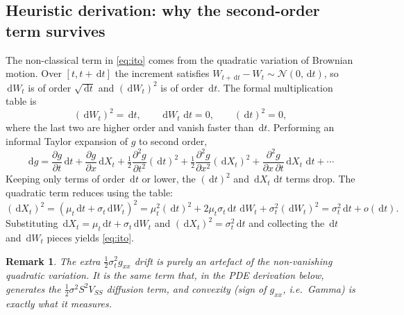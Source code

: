 \documentclass[11pt]{article}
\newcommand{\dd}{\,\mathrm{d}}
\newtheorem{remark}{Remark}
\begin{document}
\subsection{Heuristic derivation: why the second-order term survives}
The non-classical term in \eqref{eq:ito} comes from the quadratic variation of Brownian motion.
Over $[t,t+\dd t]$ the increment satisfies $W_{t+\dd t}-W_t \sim \mathcal N(0,\dd t)$, so
$\dd W_t$ is of order $\sqrt{\dd t}$ and $(\dd W_t)^2$ is of order $\dd t$. The formal multiplication
table is
\begin{equation}
(\dd W_t)^2 = \dd t,
\qquad
\dd W_t\,\dd t = 0,
\qquad
(\dd t)^2 = 0,
\end{equation}
where the last two are higher order and vanish faster than $\dd t$. Performing an informal Taylor
expansion of $g$ to second order,
\begin{equation}
\dd g
= \frac{\partial g}{\partial t}\dd t
+ \frac{\partial g}{\partial x}\dd X_t
+ \tfrac12\frac{\partial^2 g}{\partial t^2}(\dd t)^2
+ \tfrac12\frac{\partial^2 g}{\partial x^2}(\dd X_t)^2
+ \frac{\partial^2 g}{\partial x\,\partial t}\dd X_t\,\dd t + \cdots
\end{equation}
Keeping only terms of order $\dd t$ or lower, the $(\dd t)^2$ and $\dd X_t\,\dd t$ terms drop. The
quadratic term reduces using the table:
\begin{equation}
(\dd X_t)^2
= (\mu_t \dd t + \sigma_t \dd W_t)^2
= \mu_t^2 (\dd t)^2 + 2\mu_t\sigma_t \dd t\,\dd W_t + \sigma_t^2 (\dd W_t)^2
= \sigma_t^2 \dd t + o(\dd t).
\end{equation}
Substituting $\dd X_t = \mu_t\dd t + \sigma_t \dd W_t$ and $(\dd X_t)^2 = \sigma_t^2\dd t$ and
collecting the $\dd t$ and $\dd W_t$ pieces yields \eqref{eq:ito}.

\begin{remark}
The extra $\tfrac12 \sigma_t^2 g_{xx}$ drift is purely an artefact of the non-vanishing quadratic
variation. It is the same term that, in the PDE derivation below, generates the
$\tfrac12\sigma^2 S^2 V_{SS}$ diffusion term, and convexity (sign of $g_{xx}$, i.e.\ Gamma) is exactly
what it measures.
\end{remark}
\end{document}
